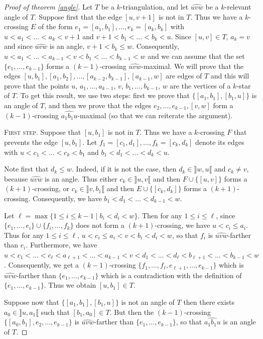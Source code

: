 \documentclass[12pt]{amsart}
\begin{document}
\begin{proof}[Proof of theorem \ref{angle}]
Let $T$ be a $k$-triangulation, and let $\widehat{uvw}$ be a $k$-relevant angle of $T$. 
Suppose first that the edge $[u,v+1]$ is not in $T$. Thus we have a $k$-crossing $E$ of the form $e_1=[a_1,b_1],\ldots,e_k=[a_k,b_k]$ with $u<a_1<\ldots<a_k<v+1$ and $v+1<b_1<\ldots<b_k<u$. Since $[u,v]\in T$, $a_k=v$ and since $\widehat{uvw}$ is an angle, $v+1<b_k\le w$. Consequently, $u<a_1<\ldots<a_{k-1}<v<b_1<\ldots<b_{k-1}<w$ and we can assume that the set $\{e_1,\ldots,e_{k-1}\}$ forms a $(k-1)$-crossing $\widehat{uvw}$-maximal. We will prove that the edges $[u,b_1], [a_1,b_2],\ldots, [a_{k-2},b_{k-1}],[a_{k-1},w]$ are edges of $T$ and this will prove that the points $u$, $a_1,\ldots,a_{k-1}$, $v$, $b_1,\ldots,b_{k-1}$, $w$ are the vertices of a $k$-star of $T$. To get this result, we use two steps: first we prove that $\{[a_1,b_1],[b_1,u]\}$ is an angle of $T$, and then we prove that the edges $e_2,\ldots,e_{k-1},[v,w]$ form a $(k-1)$-crossing $\widehat{a_1b_1u}$-maximal (so that we can reiterate the argument).

\medskip
\noindent\textsc{First step.}
Suppose that $[u,b_1]$ is not in $T$. Thus we have a $k$-crossing $F$ that prevents the edge $[u,b_1]$. Let $f_1=[c_1,d_1],\ldots,f_k=[c_k,d_k]$ denote its edges with $u<c_1<\ldots<c_k<b_1$ and $b_1<d_1<\ldots<d_k<u$.

Note first that $d_k\le w$. Indeed, if it is not the case, then $d_k\in\rrbracket w,u\llbracket$ and $c_k\ne v$, because $\widehat{uvw}$ is an angle. Thus either $c_k\in\rrbracket u,v\llbracket$ and  then $F\cup\{[u,v]\}$ forms a $(k+1)$-crossing, or $c_k\in\rrbracket v,b_1\llbracket$ and  then $E\cup\{[c_k,d_k]\}$ forms a $(k+1)$-crossing. Consequently, we have $b_1<d_1<\ldots<d_{k-1}<w$.

Let $\ell=\max\{1\le i\le {k-1}\;|\; b_i< d_i<w\}$. Then for any $1\le i\le\ell$, since $\{e_1,\ldots,e_i\}\cup\{f_i,\ldots,f_k\}$ does not form a $(k+1)$-crossing, we have $u<c_i\le a_i$. Thus for any $1\le i\le\ell$, $u<c_i\le a_i<v<b_i<d_i<w$, so that $f_i$ is $\widehat{uvw}$-farther than $e_i$. Furthermore, we have $u<c_1<\ldots<c_\ell< a_{\ell+1}<\ldots<a_{k-1}<v<d_1<\ldots<d_\ell<b_{\ell+1}<\ldots<b_{k-1}<w$. Consequently, we get a $(k-1)$-crossing $\{f_1,\ldots,f_\ell,e_{\ell+1},\ldots,e_{k-1}\}$ which is $\widehat{uvw}$-farther than $\{e_1,\ldots,e_{k-1}\}$ which is a contradiction with the definition of $\{e_1,\ldots,e_{k-1}\}$. Thus we obtain $[u,b_1]\in T$.

Suppose now that $\{[a_1,b_1],[b_1,u]\}$ is not an angle of $T$ then there exists $a_0\in \rrbracket u,a_1\llbracket$ such that $[b_1,a_0]\in T$. But then the $(k-1)$-crossing $\{[a_0,b_1],e_2,\ldots,e_{k-1}\}$ is $\widehat{uvw}$-farther than $\{e_1,\ldots,e_{k-1}\}$, so that $\widehat{a_1b_1u}$ is an angle of $T$.


\end{proof}
\end{document}
